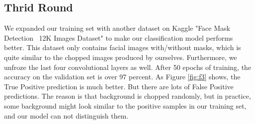 \documentclass[10pt,a4paper]{report}
\begin{document}
\subsection{Thrid Round}
We expanded our training set with another dataset on Kaggle "Face Mask Detection ~12K Images Dataset" \cite{face12k} to make our classification model performs better. This dataset only contains facial images with/without masks, which is quite similar to the chopped images produced by ourselves. Furthermore, we unfroze the last four convolutional layers as well. After 50 epochs of training, the accuracy on the validation set is over 97 percent. As Figure \ref{fig:f3} shows, the True Positive prediction is much better. But there are lots of False Positive predictions. The reason is that background is chopped randomly, but in practice, some background might look similar to the positive samples in our training set, and our model can not distinguish them.
\end{document}
